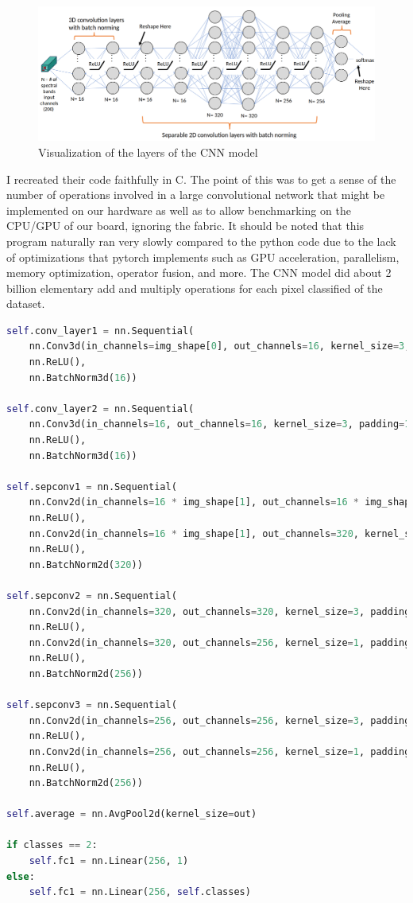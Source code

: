 \documentclass{article}
\begin{document}
\begin{figure}[ht]
\centering
\includegraphics[scale=0.2]{cnn_arch.png}
\caption{Visualization of the layers of the CNN model \cite{dirk-presentation}}
\end{figure}

I recreated their code faithfully in C. The point of this was to get a sense of the number of operations involved in a large convolutional network that might be implemented on our hardware as well as to allow benchmarking on the CPU/GPU of our board, ignoring the fabric. It should be noted that this program naturally ran very slowly compared to the python code due to the lack of optimizations that pytorch implements such as GPU acceleration, parallelism, memory optimization, operator fusion, and more. The CNN model did about 2 billion elementary add and multiply operations for each pixel classified of the dataset.

\begin{lstlisting}[language=python]
self.conv_layer1 = nn.Sequential(
    nn.Conv3d(in_channels=img_shape[0], out_channels=16, kernel_size=3, padding=1),
    nn.ReLU(),
    nn.BatchNorm3d(16))

self.conv_layer2 = nn.Sequential(
    nn.Conv3d(in_channels=16, out_channels=16, kernel_size=3, padding=1),
    nn.ReLU(),
    nn.BatchNorm3d(16))

self.sepconv1 = nn.Sequential(
    nn.Conv2d(in_channels=16 * img_shape[1], out_channels=16 * img_shape[1], kernel_size=5, padding=2, groups=16 * img_shape[1]),
    nn.ReLU(),
    nn.Conv2d(in_channels=16 * img_shape[1], out_channels=320, kernel_size=1, padding=0),
    nn.ReLU(),
    nn.BatchNorm2d(320))

self.sepconv2 = nn.Sequential(
    nn.Conv2d(in_channels=320, out_channels=320, kernel_size=3, padding=1, stride=stride, groups=320),
    nn.ReLU(),
    nn.Conv2d(in_channels=320, out_channels=256, kernel_size=1, padding=0),
    nn.ReLU(),
    nn.BatchNorm2d(256))

self.sepconv3 = nn.Sequential(
    nn.Conv2d(in_channels=256, out_channels=256, kernel_size=3, padding=1, stride=stride, groups=256),
    nn.ReLU(),
    nn.Conv2d(in_channels=256, out_channels=256, kernel_size=1, padding=0),
    nn.ReLU(),
    nn.BatchNorm2d(256))

self.average = nn.AvgPool2d(kernel_size=out)

if classes == 2:
    self.fc1 = nn.Linear(256, 1)
else:
    self.fc1 = nn.Linear(256, self.classes)
\end{lstlisting}
\end{document}
